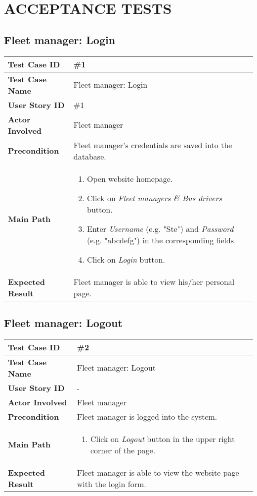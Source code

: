 \section{ACCEPTANCE TESTS}

\subsection{Fleet manager: Login}
\begin{center}
	\begin{tabular} { | m{3.5cm} | m{9.5cm} | }
		\hline
		\textbf{Test Case ID} & \#1\\
		\hline
		\textbf{Test Case Name} & Fleet manager: Login\\
		\hline
		\textbf{User Story ID} & \#1\\
		\hline
		\textbf{Actor Involved} & Fleet manager\\
		\hline
		\textbf{Precondition} & Fleet manager's credentials are saved into the database.\\
		\hline
		\textbf{Main Path} & 
		\begin{enumerate}
			\item Open website homepage.
			\item Click on \textit{Fleet managers \& Bus drivers} button.
			\item Enter \textit{Username} (e.g. "Ste") and \textit{Password} (e.g. "abcdefg") in the corresponding fields.
			\item Click on \textit{Login} button.
		\end{enumerate}\\
		\hline
		\textbf{Expected Result} & Fleet manager is able to view his/her personal page.\\
		\hline
	\end{tabular}
\end{center}

\subsection{Fleet manager: Logout}
\begin{center}
	\begin{tabular} { | m{3.5cm} | m{9.5cm} | }
		\hline
		\textbf{Test Case ID} & \#2\\
		\hline
		\textbf{Test Case Name} & Fleet manager: Logout\\
		\hline
		\textbf{User Story ID} & - \\
		\hline
		\textbf{Actor Involved} & Fleet manager\\
		\hline
		\textbf{Precondition} & Fleet manager is logged into the system.\\
		\hline
		\textbf{Main Path} & 
		\begin{enumerate}
			\item Click on \textit{Logout} button in the upper right corner of the page.
		\end{enumerate}\\
		\hline
		\textbf{Expected Result} & Fleet manager is able to view the website page with the login form.\\
		\hline
	\end{tabular}
\end{center}
\newpage
